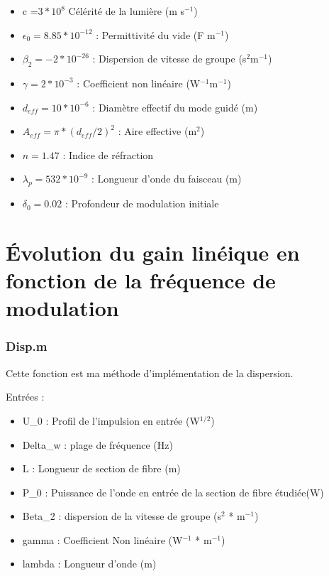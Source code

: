\documentclass[a4paper,12pt,titlepage]{article}
\begin{document}
        \begin{itemize}
            \item c =$ 3*10^8 $                    Célérité de la lumière (m s$^{-1}$)
            \item $\epsilon_0 = 8.85 * 10^{-12}$ :   Permittivité du vide (F m$^{-1}$)
            \item $\beta_2 = -2 * 10^{-26}$ :       Dispersion de vitesse de groupe (s$^2$m$^{-1}$)
            \item $\gamma = 2*10^{-3}$ :            Coefficient non linéaire (W$^{-1}$m$^{-1}$)
            \item $d_{eff} = 10*10^{-6}$ :           Diamètre effectif du mode guidé (m)
            \item $A_{eff} = \pi*(d_{eff}/2)^2$ :       Aire effective (m$^2$)
            \item $n = 1.47$ :                     Indice de réfraction
            \item $\lambda_p = 532 * 10^{-9}$ :    Longueur d'onde du faisceau (m)
            \item $\delta_0 = 0.02$ :              Profondeur de modulation initiale
        \end{itemize}
        
    \newpage
    
    \section{Évolution du gain linéique en fonction de la fréquence de modulation}
    
        
        \subsubsection*{Disp.m}\label{Disp}
             Cette fonction est ma méthode d'implémentation de la dispersion.
             
             Entrées :
             \begin{itemize}
                 \item U\_0 : Profil de l'impulsion en entrée (W$^{1/2}$)
                 \item Delta\_w : plage de fréquence (Hz)
                 \item L : Longueur de section de fibre (m)
                 \item P\_0 : Puissance de l'onde en entrée de la section de fibre étudiée(W)
                 \item Beta\_2 : dispersion de la vitesse de groupe (s$^2$ * m$^{-1}$)
                 \item gamma :  Coefficient Non linéaire (W$^{-1}$ * m$^{-1}$)
                 \item lambda : Longueur d'onde (m)
             \end{itemize}
            
\end{document}
